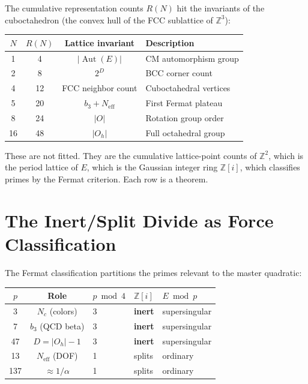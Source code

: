 \documentclass[12pt]{article}
\theoremstyle{definition}
\theoremstyle{remark}
\begin{document}
The cumulative representation counts $R(N)$ hit the invariants of the cuboctahedron (the convex hull of the FCC sublattice of $\mathbb{Z}^3$):

\begin{center}
\renewcommand{\arraystretch}{1.2}
\begin{tabular}{@{}cccl@{}}
\toprule
$N$ & $R(N)$ & Lattice invariant & Description \\
\midrule
1 & 4 & $|\operatorname{Aut}(E)|$ & CM automorphism group \\
2 & 8 & $2^D$ & BCC corner count \\
4 & 12 & FCC neighbor count & Cuboctahedral vertices \\
5 & 20 & $b_3 + N_\mathrm{eff}$ & First Fermat plateau \\
8 & 24 & $|O|$ & Rotation group order \\
16 & 48 & $|O_h|$ & Full octahedral group \\
\bottomrule
\end{tabular}
\end{center}

These are not fitted. They are the cumulative lattice-point counts of $\mathbb{Z}^2$, which is the period lattice of $E$, which is the Gaussian integer ring $\mathbb{Z}[i]$, which classifies primes by the Fermat criterion. Each row is a theorem.

\section{The Inert/Split Divide as Force Classification}
\label{sec:forces}

The Fermat classification partitions the primes relevant to the master quadratic:

\begin{center}
\renewcommand{\arraystretch}{1.2}
\begin{tabular}{@{}cclll@{}}
\toprule
$p$ & Role & $p \bmod 4$ & $\mathbb{Z}[i]$ & $E \bmod p$ \\
\midrule
3 & $N_c$ (colors) & 3 & \textbf{inert} & supersingular \\
7 & $b_3$ (QCD beta) & 3 & \textbf{inert} & supersingular \\
47 & $D = |O_h| - 1$ & 3 & \textbf{inert} & supersingular \\
\midrule
13 & $N_\mathrm{eff}$ (DOF) & 1 & splits & ordinary \\
137 & $\approx 1/\alpha$ & 1 & splits & ordinary \\
\bottomrule
\end{tabular}
\end{center}
\end{document}
